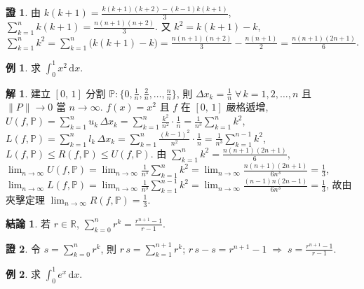 \documentclass[12pt]{extarticle}
\newcommand{\ds}{\displaystyle}
\newcommand{\ie}{\;\Longrightarrow\;}
\theoremstyle{definition}
\newtheorem*{fact}{結論}
\newtheorem*{ex}{例}
\newtheorem*{sol}{解}
\newtheorem*{prf}{證}
\begin{document}
\begin{prf}
  由 $\ds k(k + 1) = \frac{k(k + 1)(k + 2) - (k - 1)k(k + 1)}{3}$, $\ds\sum_{k = 1}^n k(k + 1) = \frac{n(n+1)(n+2)}{3}$. 又 $\ds k^2 = k(k + 1) - k$, $\ds\sum_{k = 1}^n k^2 = \sum_{k = 1}^n \big(k(k + 1) - k\big) = \frac{n(n + 1)(n + 2)}{3} - \frac{n(n + 1)}{2} = \frac{n(n + 1)(2n + 1)}{6}$.  
\end{prf}

\begin{ex}
  求 $\ds\int_0^1 x^2\,\text{d}x$. 
\end{ex}

\begin{sol}
  建立 $\ds [0,\,1]$ 分割 $\ds\mathbb{P}: \Big\{0, \frac{1}{n}, \frac{2}{n}, \ldots, \frac{n}{n}\Big\}$, 則 $\ds\Delta x_k = \frac{1}{n}\;\forall\,k=1,2,\ldots,n$ 且 $\ds\|P\|\to 0$ 當 $n\to\infty$. $f(x) = x^2$ 且 $f$ 在 $[0,\,1]$ 嚴格遞增, $\ds U(f,\mathbb{P}) = \sum_{k=1}^n u_k\,\Delta x_k = \sum_{k=1}^n\frac{k^2}{n^2}\cdot\frac{1}{n} = \frac{1}{n^3}\sum_{k = 1}^n k^2$, $\ds L(f,\mathbb{P}) = \sum_{k=1}^n l_k\,\Delta x_k = \sum_{k=1}^n\frac{(k - 1)^2}{n^2}\cdot\frac{1}{n} = \frac{1}{n^3}\sum_{k = 1}^{n-1}k^2$, $\ds L(f,\mathbb{P})\leqslant R(f,\mathbb{P})\leqslant U(f, \mathbb{P})$. 由 $\ds\sum_{k = 1}^n k^2 = \frac{n(n + 1)(2n + 1)}{6}$, $\ds\lim_{n\to\infty} U(f,\mathbb{P}) = \lim_{n\to\infty}\frac{1}{n^3}\sum_{k = 1}^n k^2 = \lim_{n\to\infty}\frac{n(n + 1)(2 n + 1)}{6n^3} = \frac{1}{3}$, $\ds\lim_{n\to\infty} L(f,\mathbb{P}) = \lim_{n\to\infty}\frac{1}{n^3}\sum_{k = 1}^{n - 1} k^2 = \lim_{n\to\infty}\frac{(n - 1)n(2 n - 1)}{6n^3} = \frac{1}{3}$, 故由夾擊定理 $\ds\lim_{n\to\infty} R(f,\mathbb{P}) = \frac{1}{3}$. 
\end{sol}

\begin{fact}
  若 $r\in\mathbb{R}$, $\ds\sum_{k = 0}^n r^k = \frac{r^{n+1} - 1}{r - 1}$. 
\end{fact}

\begin{prf}
  令 $\ds s = \sum_{k = 0}^n r^k$, 則 $\ds r\,s = \sum_{k = 1}^{n + 1} r^k$; $\ds r\,s - s = r^{n + 1} - 1\ie s = \frac{r^{n + 1} - 1}{r - 1}$.  
\end{prf}

\begin{ex}
  求 $\ds\int_0^1 e^x\,\text{d}x$. 
\end{ex}
\end{document}
